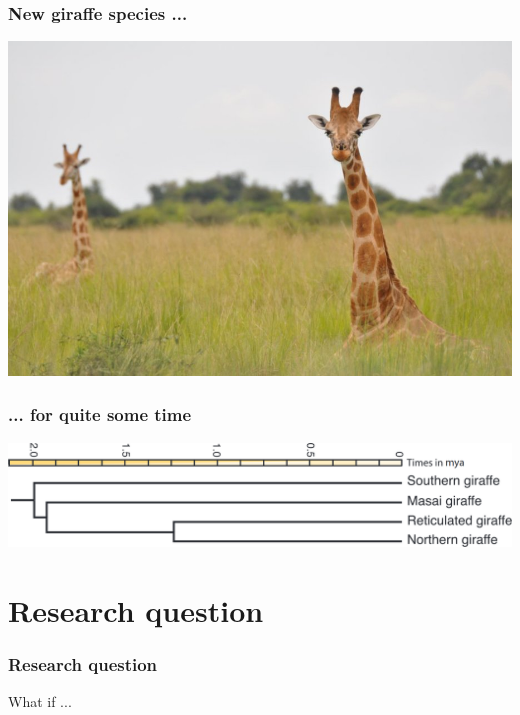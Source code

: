 \documentclass{beamer}
\begin{document}




\begin{frame}
  \frametitle{New giraffe species ... \footnotemark\footnotemark}
  \includegraphics[height=0.8\textheight]{fennessy_2016_nubian_giraffe.jpg}
\end{frame}

\begin{frame}
  \frametitle{... for quite some time\footnotemark}
  \includegraphics[width=\textwidth]{fennessy_2016_tree.png}
\end{frame}

\section[Section]{Research question}

\begin{frame}
  \frametitle{Research question}

  What if ...
\end{frame}
\end{document}
